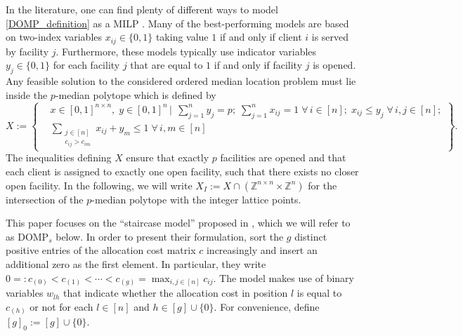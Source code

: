 \documentclass[letterpaper]{article}
\begin{document}
In the literature, one can find plenty of different ways to model \eqref{DOMP_definition} as a MILP \citep[e.g.,][]{labbe_comparative_2017, marin_fresh_2020, ljubic_benders_2024}. Many of the best-performing models are based on two-index variables $x_{ij} \in \{0, 1\}$ taking value $1$ if and only if client $i$ is served by facility $j$. Furthermore, these models typically use indicator variables $y_j \in \{0,1\}$ for each facility $j$ that are equal to $1$ if and only if facility $j$ is opened. Any feasible solution to the considered ordered median location problem must lie inside the $p$-median polytope which is defined by
\[
X := \left\{\begin{aligned}
  &x \in [0,1]^{n \times n}, \; y \in [0,1]^n \, \bigg| \, \; 
  \sum_{j=1}^n y_{j} = p; \; \sum_{j=1}^n x_{ij} = 1 \; \forall \, i \in [n]; \;
  x_{ij} \leq y_j \; \forall \, i,j \in [n]; \\
  &\sum_{\substack{j \in [n] \\ c_{ij} > c_{im}}} x_{ij} + y_m \leq 1 
  \; \forall \, i, m \in [n]
\end{aligned}\right\}.
\]
The inequalities defining $X$ ensure that exactly $p$ facilities are opened and that each client is assigned to exactly one open facility, such that there exists no closer open facility. In the following, we will write $X_I := X \cap (\mathbb{Z}^{n\times n} \times \mathbb{Z}^n)$ for the intersection of the $p$-median polytope with the integer lattice points.

This paper focuses on the \enquote{staircase model} proposed in \cite{labbe_comparative_2017}, which we will refer to as $\text{DOMP}_{s}$ below. In order to present their formulation, \citet{labbe_comparative_2017} sort the $g$ distinct positive entries of the allocation cost matrix $c$ increasingly and insert an additional zero as the first element. In particular, they write $0 =: c_{(0)} < c_{(1)} < \cdots < c_{(g)} = \max_{i,j \in [n]} c_{ij}$. The model makes use of binary variables $w_{lh}$ that indicate whether the allocation cost in position $l$ is equal to $c_{(h)}$ or not for each $l \in [n]$ and $h \in [g] \cup \{0\}$. For convenience, define $[g]_0 := [g] \cup \{0\}$.
\end{document}

